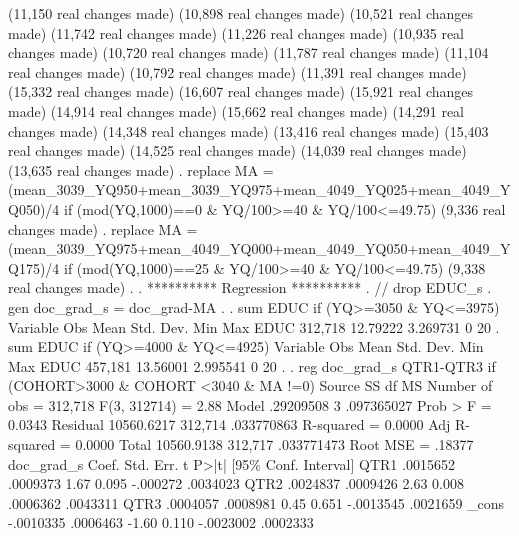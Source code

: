 (11,150 real changes made)
(10,898 real changes made)
(10,521 real changes made)
(11,742 real changes made)
(11,226 real changes made)
(10,935 real changes made)
(10,720 real changes made)
(11,787 real changes made)
(11,104 real changes made)
(10,792 real changes made)
(11,391 real changes made)
(15,332 real changes made)
(16,607 real changes made)
(15,921 real changes made)
(14,914 real changes made)
(15,662 real changes made)
(14,291 real changes made)
(14,348 real changes made)
(13,416 real changes made)
(15,403 real changes made)
(14,525 real changes made)
(14,039 real changes made)
(13,635 real changes made)
{\smallskip}
. replace MA = (mean_3039_YQ950+mean_3039_YQ975+mean_4049_YQ025+mean_4049_YQ050)/4 if (mod(YQ,1000)==0 \& YQ/100>=40 \& YQ/100<=49.75)
(9,336 real changes made)
{\smallskip}
. replace MA = (mean_3039_YQ975+mean_4049_YQ000+mean_4049_YQ050+mean_4049_YQ175)/4 if (mod(YQ,1000)==25 \& YQ/100>=40 \& YQ/100<=49.75)
(9,338 real changes made)
{\smallskip}
. 
. **********  Regression **********
. // drop EDUC_s
. gen doc_grad_s = doc_grad-MA
{\smallskip}
. 
. sum EDUC if (YQ>=3050 \& YQ<=3975)
{\smallskip}
    Variable {\VBAR}        Obs        Mean    Std. Dev.       Min        Max
        EDUC {\VBAR}    312,718    12.79222    3.269731          0         20
{\smallskip}
. sum EDUC if (YQ>=4000 \& YQ<=4925)
{\smallskip}
    Variable {\VBAR}        Obs        Mean    Std. Dev.       Min        Max
        EDUC {\VBAR}    457,181    13.56001    2.995541          0         20
{\smallskip}
. 
. reg doc_grad_s QTR1-QTR3  if (COHORT>3000 \& COHORT <3040 \& MA !=0)
{\smallskip}
      Source {\VBAR}       SS           df       MS      Number of obs   =   312,718
   F(3, 312714)    =      2.88
       Model {\VBAR}   .29209508         3  .097365027   Prob > F        =    0.0343
    Residual {\VBAR}  10560.6217   312,714  .033770863   R-squared       =    0.0000
   Adj R-squared   =    0.0000
       Total {\VBAR}  10560.9138   312,717  .033771473   Root MSE        =    .18377
{\smallskip}
  doc_grad_s {\VBAR}      Coef.   Std. Err.      t    P>|t|     [95\% Conf. Interval]
        QTR1 {\VBAR}   .0015652   .0009373     1.67   0.095     -.000272    .0034023
        QTR2 {\VBAR}   .0024837   .0009426     2.63   0.008     .0006362    .0043311
        QTR3 {\VBAR}   .0004057   .0008981     0.45   0.651    -.0013545    .0021659
       _cons {\VBAR}  -.0010335   .0006463    -1.60   0.110    -.0023002    .0002333
